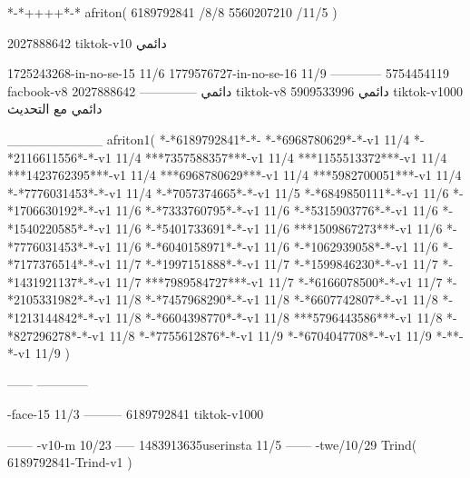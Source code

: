 *-*++++*-*
afriton(
6189792841 /8/8
5560207210 /11/5
)

2027888642 tiktok-v10
دائمي

1725243268-in-no-se-15 11/6
1779576727-in-no-se-16 11/9
------------
5754454119 facbook-v8
دائمي
--------------
2027888642 tiktok-v8
دائمي
5909533996 tiktok-v1000
دائمي مع التحديث

__________
afriton1(
*-*6189792841*-*-
*-*6968780629*-*-v1 11/4
*-*2116611556*-*-v1 11/4
***7357588357***-v1 11/4
***1155513372***-v1 11/4
***1423762395***-v1 11/4
***6968780629***-v1 11/4
***5982700051***-v1 11/4
*-*7776031453*-*-v1 11/4
*-*7057374665*-*-v1 11/5
*-*6849850111*-*-v1 11/6
*-*1706630192*-*-v1 11/6
*-*7333760795*-*-v1 11/6
*-*5315903776*-*-v1 11/6
*-*1540220585*-*-v1 11/6
*-*5401733691*-*-v1 11/6
***1509867273***-v1 11/6
*-*7776031453*-*-v1 11/6
*-*6040158971*-*-v1 11/6
*-*1062939058*-*-v1 11/6
*-*7177376514*-*-v1 11/7
*-*1997151888*-*-v1 11/7
*-*1599846230*-*-v1 11/7
*-*1431921137*-*-v1 11/7
***7989584727***-v1 11/7
*-*6166078500*-*-v1 11/7
*-*2105331982*-*-v1 11/8
*-*7457968290*-*-v1 11/8
*-*6607742807*-*-v1 11/8
*-*1213144842*-*-v1 11/8
*-*6604398770*-*-v1 11/8
***5796443586***-v1 11/8
*-*827296278*-*-v1 11/8
*-*7755612876*-*-v1 11/9
*-*6704047708*-*-v1 11/9
*-**-*-v1 11/9
)

------
------------

-face-15 11/3
---------
6189792841 tiktok-v1000

------
-v10-m 10/23
-----
1483913635userinsta 11/5
------
-twe/10/29
Trind(
6189792841-Trind-v1 
)
